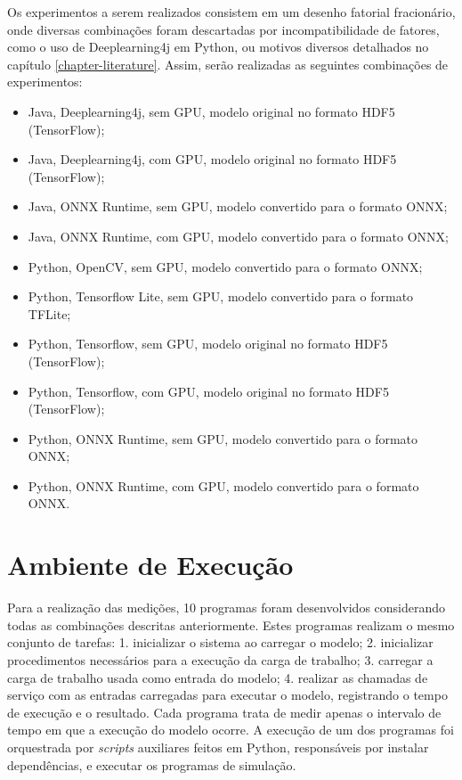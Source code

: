 Os experimentos a serem realizados consistem em um desenho fatorial fracionário, onde diversas combinações foram descartadas por incompatibilidade de fatores, como o uso de Deeplearning4j em Python, ou motivos diversos detalhados no capítulo \ref{chapter-literature}. Assim, serão realizadas as seguintes combinações de experimentos:

\begin{itemize}
  \item Java, Deeplearning4j, sem GPU, modelo original no formato HDF5 (TensorFlow);
  \item Java, Deeplearning4j, com GPU, modelo original no formato HDF5 (TensorFlow);
  \item Java, ONNX Runtime, sem GPU, modelo convertido para o formato ONNX;
  \item Java, ONNX Runtime, com GPU, modelo convertido para o formato ONNX;
  \item Python, OpenCV, sem GPU, modelo convertido para o formato ONNX;
  \item Python, Tensorflow Lite, sem GPU, modelo convertido para o formato TFLite;
  \item Python, Tensorflow, sem GPU, modelo original no formato HDF5 (TensorFlow);
  \item Python, Tensorflow, com GPU, modelo original no formato HDF5 (TensorFlow);
  \item Python, ONNX Runtime, sem GPU, modelo convertido para o formato ONNX;
  \item Python, ONNX Runtime, com GPU, modelo convertido para o formato ONNX.
\end{itemize}

\section{Ambiente de Execução}

Para a realização das medições, 10 programas foram desenvolvidos considerando todas as combinações descritas anteriormente. Estes programas realizam o mesmo conjunto de tarefas: 1. inicializar o sistema ao carregar o modelo; 2. inicializar procedimentos necessários para a execução da carga de trabalho; 3. carregar a carga de trabalho usada como entrada do modelo; 4. realizar as chamadas de serviço com as entradas carregadas para executar o modelo, registrando o tempo de execução e o resultado. Cada programa trata de medir apenas o intervalo de tempo em que a execução do modelo ocorre. A execução de um dos programas foi orquestrada por \textit{scripts} auxiliares feitos em Python, responsáveis por instalar dependências, e executar os programas de simulação.

